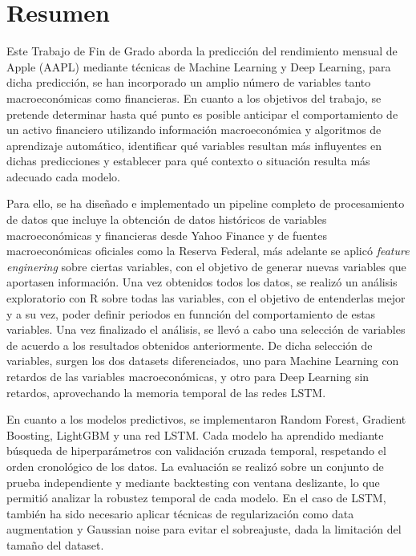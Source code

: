 \chapter*{Resumen}
Este Trabajo de Fin de Grado aborda la predicción del rendimiento mensual de Apple (AAPL) mediante técnicas de Machine Learning y Deep Learning, para dicha predicción, se han incorporado un amplio número de variables tanto macroeconómicas como financieras. En cuanto a los objetivos del trabajo, se pretende determinar hasta qué punto es posible anticipar el comportamiento de un activo financiero utilizando información macroeconómica y algoritmos de aprendizaje automático, identificar qué variables resultan más influyentes en dichas predicciones y establecer para qué contexto o situación resulta más adecuado cada modelo.

Para ello, se ha diseñado e implementado un pipeline completo de procesamiento de datos que incluye la obtención de datos históricos de variables macroeconómicas y financieras desde Yahoo Finance y de fuentes macroeconómicas oficiales como la Reserva Federal, más adelante se aplicó \emph{feature enginering} sobre ciertas variables, con el objetivo de generar nuevas variables que aportasen información. Una vez obtenidos todos los datos, se realizó un análisis exploratorio con R sobre todas las variables, con el objetivo de entenderlas mejor y a su vez, poder definir periodos en funnción del comportamiento de estas variables. Una vez finalizado el análisis, se llevó a cabo una selección de variables de acuerdo a los resultados obtenidos anteriormente. De dicha selección de variables, surgen los dos datasets diferenciados, uno para Machine Learning con retardos de las variables macroeconómicas, y otro para Deep Learning sin retardos, aprovechando la memoria temporal de las redes LSTM.

En cuanto a los modelos predictivos, se implementaron Random Forest, Gradient Boosting, LightGBM y una red LSTM. Cada modelo ha aprendido mediante búsqueda de hiperparámetros con validación cruzada temporal, respetando el orden cronológico de los datos. La evaluación se realizó sobre un conjunto de prueba independiente y mediante backtesting con ventana deslizante, lo que permitió analizar la robustez temporal de cada modelo. En el caso de LSTM, también ha sido necesario aplicar técnicas de regularización como data augmentation y Gaussian noise para evitar el sobreajuste, dada la limitación del tamaño del dataset.


